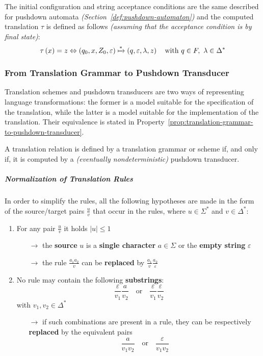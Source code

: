 \documentclass[english]{article}
\begin{document}
The initial configuration and string acceptance conditions are the same described for pushdown automata \textit{(Section~\ref{def:pushdown-automaton})} and the computed translation \(\tau\) is defined as follows \textit{(assuming that the acceptance condition is by final state)}:
\[ \tau\left( x \right) = z \Leftrightarrow \left( q_0, x, Z_0, \varepsilon \right) \xmapsto{\ast} \left( q, \varepsilon, \lambda, z \right) \quad \text{with} \ q \in F, \ \lambda \in \Delta^\ast \]

\subsubsection{From Translation Grammar to Pushdown Transducer}

Translation schemes and pushdown transducers are two ways of representing language transformations:
the former is a model suitable for the specification of the translation, while the latter is a model suitable for the implementation of the translation.
Their equivalence is stated in Property~\ref{prop:translation-grammar-to-pushdown-transducer}.

\begin{property}
  \label{prop:translation-grammar-to-pushdown-transducer}
  A translation relation is defined by a translation grammar or scheme if, and only if, it is computed by a \textit{(eventually nondeterministic)} pushdown transducer.
\end{property}

\subparagraph*{Normalization of Translation Rules}

In order to simplify the rules, all the following hypotheses are made in the form of the source/target pairs \(\frac{u}{v}\) that occur in the rules, where \(u \in \Sigma^\ast\) and \(v \in \Delta^\ast\):

\begin{enumerate}
  \item For any pair \(\frac{u}{v}\) it holds \(|u| \leq 1\)
        \begin{itemize}
          \item[\(\rightarrow\)] the \textbf{source} \(u\) is a \textbf{single character} \(a \in \Sigma\) or the \textbf{empty string} \(\varepsilon\)
          \item[\(\rightarrow\)] the rule \(\frac{a_1 a_2}{v}\) can be \textbf{replaced} by \(\frac{a_1}{v}\frac{a_2}{\varepsilon}\)
        \end{itemize}
  \item No rule may contain the following \textbf{substrings}:
        \[ \dfrac{\varepsilon}{v_1} \dfrac{a}{v_2} \quad \text{or} \quad \dfrac{\varepsilon}{v_1} \dfrac{\varepsilon}{v_2} \]
        with \(v_1, v_2 \in \Delta^\ast\)
        \begin{itemize}
          \item[\(\rightarrow\)] if such combinations are present in a rule, they can be respectively \textbf{replaced} by the equivalent pairs
            \[ \dfrac{a}{v_1 v_2} \quad \text{or} \quad \dfrac{\varepsilon}{v_1 v_2} \]
        \end{itemize}
\end{enumerate}
\end{document}
